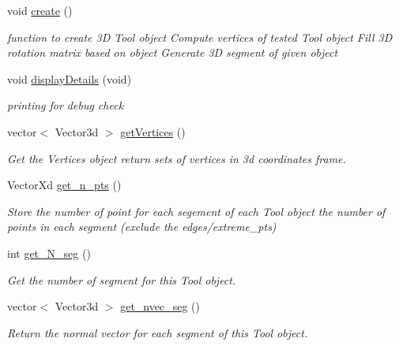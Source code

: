 \begin{DoxyCompactItemize}
void \hyperlink{classCreate__Tool_ac8a58a01a4da4d08ae5603e7fee061d6}{create} ()
\begin{DoxyCompactList}\small\item\em function to create 3D Tool object Compute vertices of tested \textquotesingle{}Tool\textquotesingle{} object Fill 3D rotation matrix based on object Generate 3D segment of given object \end{DoxyCompactList}\item 
\mbox{\label{classCreate__Tool_acf5f95173cd6baaf110cafb5ff318560}} 
void \hyperlink{classCreate__Tool_acf5f95173cd6baaf110cafb5ff318560}{display\+Details} (void)
\begin{DoxyCompactList}\small\item\em printing for debug check \end{DoxyCompactList}\item 
vector$<$ Vector3d $>$ \hyperlink{classCreate__Tool_a1393c24c8f96f4e1b41d73db18b720c3}{get\+Vertices} ()
\begin{DoxyCompactList}\small\item\em Get the Vertices object return sets of vertices in 3d coordinates frame. \end{DoxyCompactList}\item 
Vector\+Xd \hyperlink{classCreate__Tool_a0a76e83b7d85e64bb0c9aa8306a0b0f6}{get\+\_\+n\+\_\+pts} ()
\begin{DoxyCompactList}\small\item\em Store the number of point for each segement of each \textquotesingle{}Tool\textquotesingle{} object the number of points in each segment (exclude the edges/extreme\+\_\+pts) \end{DoxyCompactList}\item 
int \hyperlink{classCreate__Tool_a1140f90d5c44110f44939e564646a316}{get\+\_\+\+N\+\_\+seg} ()
\begin{DoxyCompactList}\small\item\em Get the number of segment for this \textquotesingle{}Tool\textquotesingle{} object. \end{DoxyCompactList}\item 
vector$<$ Vector3d $>$ \hyperlink{classCreate__Tool_ac997ba484168b43803bad484f2e4eaaa}{get\+\_\+nvec\+\_\+seg} ()
\begin{DoxyCompactList}\small\item\em Return the normal vector for each segment of this \textquotesingle{}Tool\textquotesingle{} object. \end{DoxyCompactList}\item 

\end{DoxyCompactItemize}
